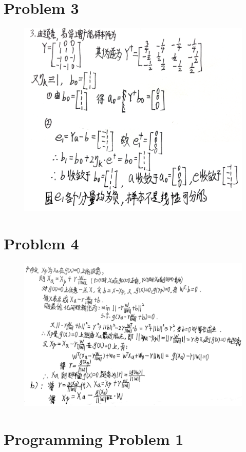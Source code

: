 \documentclass[]{article}
\begin{document}
    \section{Problem 3}
    \begin{figure}[H]
        \centering
        \includegraphics[scale=0.25]{P3.png}
    \end{figure}
    \section{Problem 4}
    \begin{figure}[H]
        \centering
        \includegraphics[scale=0.3]{P4.png}
    \end{figure}
    \section{Programming Problem 1}
\end{document}
